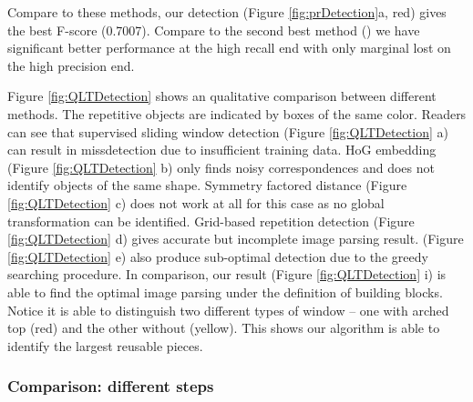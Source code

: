 \documentclass{acmtog}
\begin{document}
Compare to these methods, our detection (Figure \ref{fig:prDetection}a, red) gives the best F-score (0.7007). Compare to the second best method (\cite{Wu2010DL}) we have significant better performance at the high recall end with only marginal lost on the high precision end.  

Figure \ref{fig:QLTDetection} shows an qualitative comparison between different methods. The repetitive objects are indicated by boxes of the same color. Readers can see that supervised sliding window detection (Figure \ref{fig:QLTDetection} a) can result in missdetection due to insufficient training data. HoG embedding  (Figure \ref{fig:QLTDetection} b) only finds noisy correspondences and does not identify objects of the same shape. Symmetry factored distance \cite{LIPMANsig2010} (Figure \ref{fig:QLTDetection} c) does not work at all for this case as no global transformation can be identified. Grid-based repetition detection \cite{Wu2010DL}  (Figure \ref{fig:QLTDetection} d) gives accurate but incomplete image parsing result. \cite{Liu2013GRASP} (Figure \ref{fig:QLTDetection} e) also produce sub-optimal detection due to the greedy searching procedure. In comparison, our result (Figure \ref{fig:QLTDetection} i) is able to find the optimal image parsing under the definition of building blocks. Notice it is able to distinguish two different types of window -- one with arched top (red) and the other without (yellow). This shows our algorithm is able to identify the largest reusable pieces.


\subsubsection{Comparison: different steps}
\end{document}
